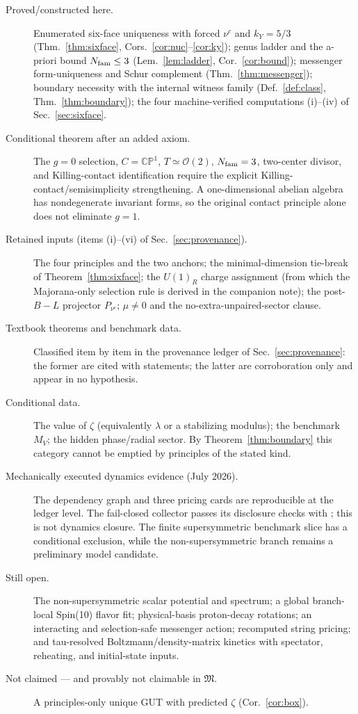 \documentclass[
  aps,
  prd,
  preprint,
  nofootinbib,
  superscriptaddress,
  longbibliography
]{revtex4-2}
\newcommand{\CP}{\mathbb{CP}}
\newcommand{\cO}{\mathcal{O}}
\begin{document}
\begin{description}
\item[Proved/constructed here.]
Enumerated six-face uniqueness with forced \(\nu^c\) and \(k_Y=5/3\)
(Thm.~\ref{thm:sixface}, Cors.~\ref{cor:nuc}--\ref{cor:ky});
genus ladder and the a-priori bound \(N_{\rm fam}\le3\)
(Lem.~\ref{lem:ladder}, Cor.~\ref{cor:bound});
messenger form-uniqueness and Schur complement (Thm.~\ref{thm:messenger});
boundary necessity with the internal witness family
(Def.~\ref{def:class}, Thm.~\ref{thm:boundary});
the four machine-verified computations (i)--(iv) of
Sec.~\ref{sec:sixface}.
\item[Conditional theorem after an added axiom.]
The \(g=0\) selection, \(C=\CP^1\), \(T\simeq\cO(2)\),
\(N_{\rm fam}=3\), two-center divisor, and Killing-contact identification
require the explicit Killing-contact/semisimplicity strengthening.  A
one-dimensional abelian algebra has nondegenerate invariant forms, so the
original contact principle alone does not eliminate \(g=1\).
\item[Retained inputs (items (i)--(vi) of Sec.~\ref{sec:provenance}).]
The four principles and the two anchors; the minimal-dimension tie-break of
Theorem~\ref{thm:sixface}; the \(U(1)_R\) charge assignment (from which the
Majorana-only selection rule is derived in the companion note); the
post-\(B\!-\!L\) projector \(P_{\nu^c}\); \(\mu\ne0\) and the
no-extra-unpaired-sector clause.
\item[Textbook theorems and benchmark data.]
Classified item by item in the provenance ledger of
Sec.~\ref{sec:provenance}: the former are cited with statements; the latter
are corroboration only and appear in no hypothesis.
\item[Conditional data.]
The value of \(\zeta\) (equivalently \(\lambda\) or a stabilizing modulus);
the benchmark \(M_V\); the hidden phase/radial sector.  By
Theorem~\ref{thm:boundary} this category cannot be emptied by principles of
the stated kind.
\item[Mechanically executed dynamics evidence (July 2026).]
The dependency graph and three pricing cards are reproducible at the ledger
level.  The fail-closed collector passes its disclosure checks with
; this is not dynamics closure.
The finite supersymmetric benchmark slice has a conditional exclusion, while
the non-supersymmetric branch remains a preliminary model candidate.
\item[Still open.]
The non-supersymmetric scalar potential and spectrum; a global branch-local
Spin(10) flavor fit; physical-basis proton-decay rotations; an interacting and
selection-safe messenger action; recomputed string pricing; and tau-resolved
Boltzmann/density-matrix kinetics with spectator, reheating, and initial-state
inputs.
\item[Not claimed --- and provably not claimable in \(\mathfrak M\).]
A principles-only unique GUT with predicted \(\zeta\)
(Cor.~\ref{cor:box}).
\end{description}
\end{document}
